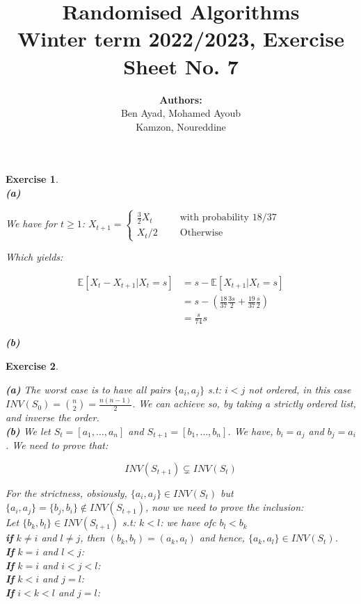 \documentclass{article}
\title{Randomised Algorithms \\
Winter term 2022/2023, Exercise Sheet No. 7}
\author{
    \textbf{Authors:} \\
    Ben Ayad, Mohamed Ayoub \\
    Kamzon, Noureddine
}
\newtheorem{exo}{Exercise}
\def\E{\mathbb{E}}
\begin{document}
\maketitle

\begin{exo}{\ \\}
\noindent
\textbf{(a)} 

We have for $t \geq 1$:  \quad \quad  $
X_{t+1}  = 
\begin{cases}
    \frac{3}{2} X_t  \quad \quad &\text{with probability 18/37} \\
    X_t/2  &\text{Otherwise}
\end{cases}
$

Which yields:

\begin{align*}
    \E[X_t-X_{t+1}| X_t = s] 
    &= s - \E[X_{t+1}|X_t = s] \\
    &= s - (\frac{18}{37} \frac{3s}{2}  + \frac{19}{37}\frac{s}{2}) \\
    &= \frac{s}{74} s
\end{align*}

\noindent
\textbf{(b)} 
\end{exo}

\begin{exo}{\ \\}


\noindent
\textbf{(a)} The worst case is to have all pairs $\{a_i,a_j\}$ s.t: $i<j$ not ordered, in this case $INV(S_0) = \binom{n}{2} = \frac{n(n-1)}{2}$. We can achieve so, by taking a strictly ordered list, and inverse the order. \\

\noindent
\textbf{(b)} We let $S_t = [a_1, \dots, a_n]$ and $S_{t+1} = [b_1, \dots, b_n]$. We have, $b_i = a_j$ and $b_j = a_i$. We need to prove that:

\[ INV(S_{t+1}) \subsetneq  INV(S_{t}) \]

For the strictness, obsiously, $\{a_i, a_j\} \in INV(S_t)$ but $\{a_i, a_j\} = \{b_j, b_i\} \notin INV(S_{t+1})$, now we need to prove the inclusion: \\

Let $\{b_k, b_l\} \in INV(S_{t+1})$ s.t: $k < l$: we have ofc $b_l < b_k$ \\

\textbf{if} $k \neq i$ and $l \neq j$, then $(b_k, b_l) = (a_k, a_l)$ and hence, $\{a_k, a_l\} \in INV(S_t)$. \\

\textbf{If} $k=i$ and $l < j$:  \\

\textbf{If} $k=i$ and $i <  j < l$:  \\

\textbf{If} $k < i$ and $j = l$: \\
\textbf{If} $i<k<l$ and $j = l$: \\



\end{exo}
\end{document}
